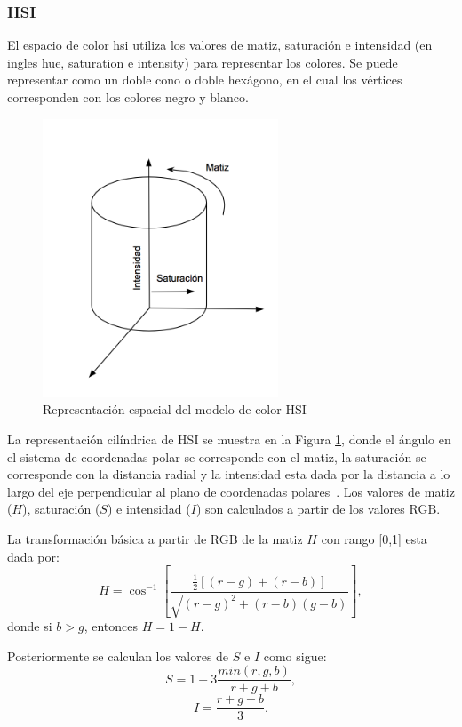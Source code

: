 \subsubsection{HSI}
El espacio de color \gls{hsi} utiliza los valores de matiz, saturación e intensidad (en ingles hue, saturation e intensity) para representar los colores. Se puede representar como un doble cono o doble hexágono, en el cual los vértices corresponden con los colores negro y blanco. 
\begin{figure}[h!]
\centering
\includegraphics[width=70mm]{./figuras/diagrama-hsi.png}
\caption{Representación espacial del modelo de color HSI}
\label{img:hsi-diagrama}
\end{figure}

La representación cilíndrica de HSI se muestra en la Figura \ref{img:hsi-diagrama}, donde el ángulo en el sistema de coordenadas polar se corresponde con el matiz, la saturación se corresponde con la distancia radial y la intensidad esta dada por la distancia a lo largo del eje perpendicular al plano de coordenadas polares~\cite{OrtizZamora2002}.
Los valores de matiz ($H$), saturación ($S$) e intensidad ($I$) son calculados a partir de los valores RGB.

La transformación básica a partir de RGB de la matiz $H$ con rango [0,1] esta dada por:
\begin{equation}
H = \cos^{-1}\left[\frac{\frac{1}{2}\left[\left(r-g\right)+\left(r-b\right)\right]}{\sqrt{\left(r-g\right)^{2}+\left(r-b\right)\left(g-b\right)}}\right],
\end{equation}
donde si $b > g$, entonces $H=1-H$.

Posteriormente se calculan los valores de $S$ e $I$ como sigue:
\begin{equation}
S = 1-3\frac{min\left(r,g,b\right)}{r+g+b},
\end{equation}
\begin{equation}
I = \frac{r+g+b}{3}.
\end{equation}
